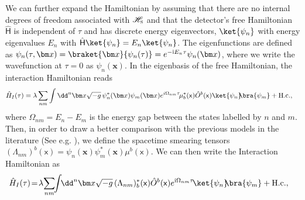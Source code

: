 \documentclass[letterpaper,12pt,titlepage,oneside,final]{book}
\newcommand{\mf}{\mathsf}%
\newcommand{\ii}{\mathrm{i}}
\begin{document}
We can further expand the Hamiltonian by assuming that there are no internal degrees of freedom associated with $\mathscr{H}_\textsc{s}$ and that the detector's free Hamiltonian $\hat{\mathsf{H}}$ is independent of $\tau$ and has discrete energy eigenvectors, $\ket{\psi_n}$ with energy eigenvalues $E_n$ with $\hat{\mathsf{H}}\ket{\psi_n} = E_n \ket{\psi_n}$. The eigenfunctions are defined as $\psi_n(\tau,\bm x) = \braket{\bm x}{\psi_n(\tau)} = e^{-\ii E_n \tau}\psi_n(\bm x)$, where we write the wavefunction at $\tau = 0$ as $\psi_n(\bm x)$. In the eigenbasis of the free Hamiltonian, the interaction Hamiltonian reads
\begin{align}
    \hat{H}_I(\tau) &= \lambda \sum_{nm}\int \dd^n \bm x \sqrt{-g}\, \psi_n^*(\bm x)\psi_m(\bm x)e^{i\Omega_{nm}\tau}\!\mu_b^*(\mf x) \hat{O}^b(\mf x)\ket{\psi_n}\!\!\bra{\psi_m}+\text{H.c.},
\end{align}
where $\Omega_{nm} = E_n - E_m$ is the energy gap between the states labelled by $n$ and $m$. Then, in order to draw a better comparison with the previous models in the literature (See e.g. \cite{us,us2,mine}), we define the spacetime smearing tensors $(\Lambda_{nm})^b(\mf x) = \psi_n(\bm x)\psi_m^*(\bm x)\mu^b(\mf x)$. We can then write the Interaction Hamiltonian as
\begin{align}\label{eq:Henergybasis}
    \hat{H}_I(\tau)\! &= \!\lambda\! \sum_{nm}\!\!\int \!\!\dd^n \bm x \sqrt{-g}\,(\Lambda_{nm})_b^*(\mf x) \hat{O}^b(\mf x)e^{\ii\Omega_{nm}\tau}\!\ket{\psi_n}\!\!\bra{\psi_m}+\text{H.c.},
\end{align}
\end{document}
